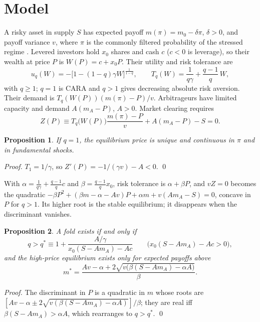 \documentclass[11pt,a4paper]{article}
\newtheorem{proposition}{Proposition}
\begin{document}
\section{Model}

A risky asset in supply $S$ has expected payoff $m(\pi)=m_0-\delta\pi$, $\delta>0$, and
payoff variance $v$, where $\pi$ is the commonly filtered probability of the stressed regime
\citep{Hamilton1989}. Levered investors hold $x_0$ shares and cash $c$ ($c<0$ is leverage),
so their wealth at price $P$ is $W(P)=c+x_0P$. Their utility and risk tolerance are
\begin{equation}
u_q(W)=-\big[1-(1-q)\gamma W\big]^{\frac{1}{1-q}},\qquad
T_q(W)=\frac{1}{q\gamma}+\frac{q-1}{q}\,W,
\end{equation}
with $q\ge1$; $q=1$ is CARA and $q>1$ gives decreasing absolute risk aversion. Their demand
is $T_q(W(P))(m(\pi)-P)/v$. Arbitrageurs have limited capacity and demand $A(m_A-P)$, $A>0$.
Market clearing requires
\begin{equation}
Z(P)\equiv T_q\big(W(P)\big)\frac{m(\pi)-P}{v}+A(m_A-P)-S=0 .
\end{equation}

\begin{proposition}\label{prop:cara}
If $q=1$, the equilibrium price is unique and continuous in $\pi$ and in fundamental shocks.
\end{proposition}

\noindent \emph{Proof.} $T_1=1/\gamma$, so $Z'(P)=-1/(\gamma v)-A<0$. \qed

With $\alpha=\frac{1}{q\gamma}+\frac{q-1}{q}c$ and $\beta=\frac{q-1}{q}x_0$, risk tolerance
is $\alpha+\beta P$, and $vZ=0$ becomes the quadratic
$-\beta P^2+(\beta m-\alpha-Av)P+\alpha m+v(Am_A-S)=0$, concave in $P$ for $q>1$. Its
higher root is the stable equilibrium; it disappears when the discriminant vanishes.

\begin{proposition}\label{prop:fold}
A fold exists if and only if
\[
q>q^*\equiv1+\frac{A/\gamma}{x_0(S-Am_A)-Ac}\qquad\big(x_0(S-Am_A)-Ac>0\big),
\]
and the high-price equilibrium exists only for expected payoffs above
\[
m^*=\frac{Av-\alpha+2\sqrt{v\big(\beta(S-Am_A)-\alpha A\big)}}{\beta}.
\]
\end{proposition}

\noindent \emph{Proof.} The discriminant in $P$ is a quadratic in $m$ whose roots are
$[Av-\alpha\pm2\sqrt{v(\beta(S-Am_A)-\alpha A)}]/\beta$; they are real iff
$\beta(S-Am_A)>\alpha A$, which rearranges to $q>q^*$. \qed
\end{document}
